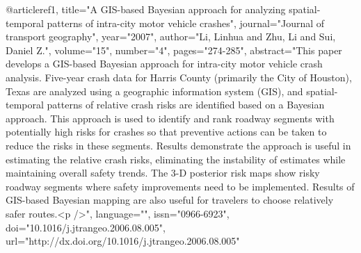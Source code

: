 @article{ref1,
title="A GIS-based Bayesian approach for analyzing spatial-temporal patterns of intra-city motor vehicle crashes",
journal="Journal of transport geography",
year="2007",
author="Li, Linhua and Zhu, Li and Sui, Daniel Z.",
volume="15",
number="4",
pages="274-285",
abstract="This paper develops a GIS-based Bayesian approach for intra-city motor vehicle crash analysis. Five-year crash data for Harris County (primarily the City of Houston), Texas are analyzed using a geographic information system (GIS), and spatial-temporal patterns of relative crash risks are identified based on a Bayesian approach. This approach is used to identify and rank roadway segments with potentially high risks for crashes so that preventive actions can be taken to reduce the risks in these segments. Results demonstrate the approach is useful in estimating the relative crash risks, eliminating the instability of estimates while maintaining overall safety trends. The 3-D posterior risk maps show risky roadway segments where safety improvements need to be implemented. Results of GIS-based Bayesian mapping are also useful for travelers to choose relatively safer routes.<p />",
language="",
issn="0966-6923",
doi="10.1016/j.jtrangeo.2006.08.005",
url="http://dx.doi.org/10.1016/j.jtrangeo.2006.08.005"
}